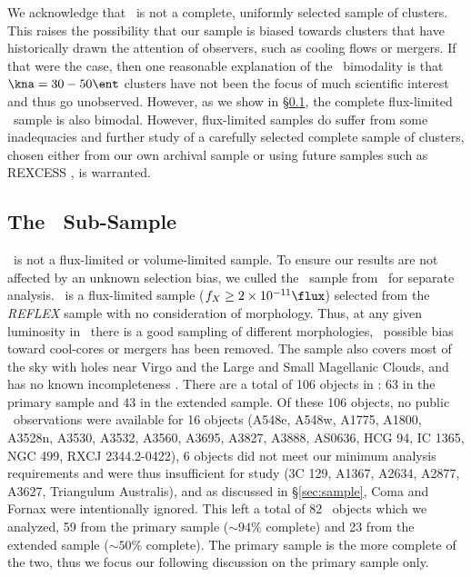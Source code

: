 \documentclass{emulateapj}
\begin{document}
We acknowledge that \accept\ is not a complete, uniformly selected
sample of clusters. This raises the possibility that our sample is
biased towards clusters that have historically drawn the attention of
observers, such as cooling flows or mergers. If that were the case,
then one reasonable explanation of the \kna\ bimodality is that $\kna
= 30-50 \ent$ clusters have not been the focus of much scientific
interest and thus go unobserved. However, as we show in
\S\ref{sec:hifl}, the complete flux-limited \hifl\ sample is also
bimodal. However, flux-limited samples do suffer from some
inadequacies and further study of a carefully selected complete sample
of clusters, chosen either from our own archival sample or using
future samples such as REXCESS \citep{rexcess}, is warranted.

\subsection{The \hifl\ Sub-Sample}
\label{sec:hifl}

\accept\ is not a flux-limited or volume-limited sample. To ensure our
results are not affected by an unknown selection bias, we culled the
\hifl\ sample from \accept\ for separate analysis. \hifl\ is a
flux-limited sample ($f_X \ge 2 \times 10^{-11} \flux$) selected from
the {\it{REFLEX}} sample \citep{reflex} with no consideration of
morphology. Thus, at any given luminosity in \hifl\ there is a good
sampling of different morphologies, \ie\ possible bias toward
cool-cores or mergers has been removed. The sample also covers most of
the sky with holes near Virgo and the Large and Small Magellanic
Clouds, and has no known incompleteness
\citep{2007A&A...466..805C}. There are a total of 106 objects in
\hifl: 63 in the primary sample and 43 in the extended sample. Of
these 106 objects, no public \chandra\ observations were available for
16 objects (A548e, A548w, A1775, A1800, A3528n, A3530, A3532, A3560,
A3695, A3827, A3888, AS0636, HCG 94, IC 1365, NGC 499, RXCJ
2344.2-0422), 6 objects did not meet our minimum analysis requirements
and were thus insufficient for study (3C 129, A1367, A2634, A2877,
A3627, Triangulum Australis), and as discussed in \S\ref{sec:sample},
Coma and Fornax were intentionally ignored. This left a total of 82
\hifl\ objects which we analyzed, 59 from the primary sample ($\sim
94\%$ complete) and 23 from the extended sample ($\sim 50\%$
complete). The primary sample is the more complete of the two, thus we
focus our following discussion on the primary sample only.
\end{document}
